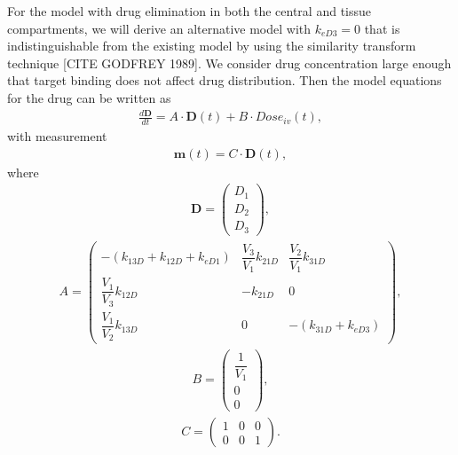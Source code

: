 For the model with drug elimination in both the central and tissue compartments, we will derive an alternative model with $k_{eD3} = 0$ that is indistinguishable from the existing model by using the similarity transform technique [CITE GODFREY 1989]. We consider drug concentration large enough that target binding does not affect drug distribution. Then the model equations for the drug can be written as 
\begin{align}
\frac{d\mathbf{D}}{dt} = A \cdot \mathbf{D}(t) + B \cdot Dose_{iv}(t), \label{model matrix}
\end{align}
with measurement
\begin{align}
\mathbf{m}(t) = C \cdot \mathbf{D}(t), \label{measurement matrix}
\end{align}
where
\begin{align}
\mathbf{D} = \begin{pmatrix}
D_1 \\
D_2 \\
D_3
\end{pmatrix},
\end{align}
\begin{align}
A = \begin{pmatrix}
-(k_{13D} + k_{12D} + k_{eD1}) & \dfrac{V_3}{V_1}k_{21D} & \dfrac{V_2}{V_1}k_{31D} \\
\dfrac{V_1}{V_3}k_{12D}        & -k_{21D}                & 0 \\
\dfrac{V_1}{V_2}k_{13D}        & 0                       & -(k_{31D} + k_{eD3})
\end{pmatrix},
\end{align}
\begin{align}
B = \begin{pmatrix}
\dfrac{1}{V_1} \\
0 \\
0
\end{pmatrix},
\end{align}
\begin{align}
C = \begin{pmatrix}
1 & 0 & 0 \\
0 & 0 & 1 
\end{pmatrix}.
\end{align}

